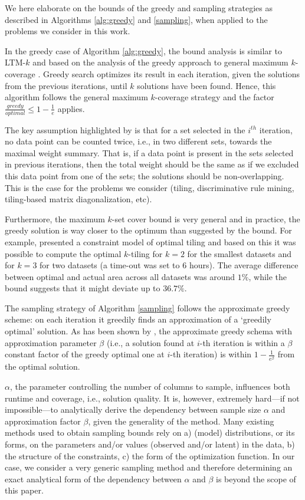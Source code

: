 We here elaborate on the bounds of the greedy and sampling strategies as described in Algorithms \ref{alg:greedy} and \ref{sampling}, when applied to the problems we consider in this work.

In the greedy case of Algorithm \ref{alg:greedy}, the bound analysis is similar to LTM-$k$ and based on the analysis of the greedy approach to general maximum $k$-coverage \parencite{max_k_set_cover1, max_k_set_cover2}. Greedy search optimizes its result in each iteration, given the solutions from the previous iterations, until $k$ solutions have been found. Hence, this algorithm follows the general maximum $k$-coverage strategy and the factor $\frac{\textit{greedy}}{\textit{optimal}} \leq 1-\frac{1}{e}$ applies.

The key assumption highlighted by \cite{max_k_set_cover1} is that for a set selected in the $i^{th}$ iteration, no data point can be counted twice, i.e., in two different sets, towards the maximal weight summary. That is, if a data point is present in the sets selected in previous iterations, then the total weight should be the same as if we excluded this data point from one of the sets; the solutions should be non-overlapping. This is the case for the problems we consider (tiling, discriminative rule mining, tiling-based matrix diagonalization, etc).

Furthermore, the maximum $k$-set cover bound is very general and in practice, the greedy solution is way closer to the optimum than suggested by the bound. For example, \cite{GunsNR13} presented a constraint model of optimal tiling and based on this it was possible to compute the optimal $k$-tiling for $k=2$ for the smallest datasets and for $k=3$ for two datasets (a time-out was set to 6 hours). The average difference between optimal and actual area across all datasets was around $1\%$, while the bound suggests that it might deviate up to $36.7\%$.

The sampling strategy of Algorithm \ref{sampling} follows the approximate greedy scheme: on each iteration it greedily finds an approximation of a `greedily optimal' solution. As has been shown by \cite{max_k_set_cover1}, the approximate greedy schema with approximation parameter $\beta$ (i.e., a solution found at $i$-th iteration is within a $\beta$ constant factor of the greedy optimal one at $i$-th iteration) is within $1-\frac{1}{e^\beta}$ from the optimal solution.

$\alpha$, the parameter controlling the number of columns to sample, influences both runtime and coverage, i.e., solution quality. It is, however, extremely hard---if not impossible---to analytically derive the dependency between sample size $\alpha$ and approximation factor $\beta$, given the generality of the method. Many existing methods used to obtain sampling bounds rely on a) (model) distributions, or its forms, on the parameters and/or values (observed and/or latent) in the data, b) the structure of the constraints, c) the form of the optimization function. In our case, we consider a very generic sampling method and therefore determining an exact analytical form of the dependency between $\alpha$ and $\beta$ is beyond the scope of this paper.

